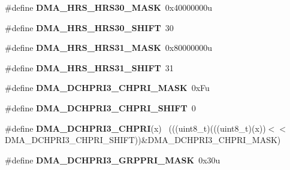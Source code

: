 \begin{DoxyCompactItemize}
\item 
\hypertarget{group___d_m_a___register___masks_ga88e7a718c482e67fd578fb6fad2b0eb4}{}\#define {\bfseries D\+M\+A\+\_\+\+H\+R\+S\+\_\+\+H\+R\+S30\+\_\+\+M\+A\+S\+K}~0x40000000u\label{group___d_m_a___register___masks_ga88e7a718c482e67fd578fb6fad2b0eb4}

\item 
\hypertarget{group___d_m_a___register___masks_ga9a353ee73d9c48a687ec33339e0a1905}{}\#define {\bfseries D\+M\+A\+\_\+\+H\+R\+S\+\_\+\+H\+R\+S30\+\_\+\+S\+H\+I\+F\+T}~30\label{group___d_m_a___register___masks_ga9a353ee73d9c48a687ec33339e0a1905}

\item 
\hypertarget{group___d_m_a___register___masks_gab1b2af9c82cbc7859e12339dd20a116c}{}\#define {\bfseries D\+M\+A\+\_\+\+H\+R\+S\+\_\+\+H\+R\+S31\+\_\+\+M\+A\+S\+K}~0x80000000u\label{group___d_m_a___register___masks_gab1b2af9c82cbc7859e12339dd20a116c}

\item 
\hypertarget{group___d_m_a___register___masks_ga720e9a6cfdc63b4a6ddf2e84f7a48e54}{}\#define {\bfseries D\+M\+A\+\_\+\+H\+R\+S\+\_\+\+H\+R\+S31\+\_\+\+S\+H\+I\+F\+T}~31\label{group___d_m_a___register___masks_ga720e9a6cfdc63b4a6ddf2e84f7a48e54}

\item 
\hypertarget{group___d_m_a___register___masks_ga4d1165f5fe24dfa63c7496f07b15e5e2}{}\#define {\bfseries D\+M\+A\+\_\+\+D\+C\+H\+P\+R\+I3\+\_\+\+C\+H\+P\+R\+I\+\_\+\+M\+A\+S\+K}~0x\+Fu\label{group___d_m_a___register___masks_ga4d1165f5fe24dfa63c7496f07b15e5e2}

\item 
\hypertarget{group___d_m_a___register___masks_gacae7dcb7b9055f80ce91ce52e36d57b6}{}\#define {\bfseries D\+M\+A\+\_\+\+D\+C\+H\+P\+R\+I3\+\_\+\+C\+H\+P\+R\+I\+\_\+\+S\+H\+I\+F\+T}~0\label{group___d_m_a___register___masks_gacae7dcb7b9055f80ce91ce52e36d57b6}

\item 
\hypertarget{group___d_m_a___register___masks_gadcbc2e3c61b70feb2217bf1a08726fe3}{}\#define {\bfseries D\+M\+A\+\_\+\+D\+C\+H\+P\+R\+I3\+\_\+\+C\+H\+P\+R\+I}(x)                                      ~(((uint8\+\_\+t)(((uint8\+\_\+t)(x))$<$$<$D\+M\+A\+\_\+\+D\+C\+H\+P\+R\+I3\+\_\+\+C\+H\+P\+R\+I\+\_\+\+S\+H\+I\+F\+T))\&D\+M\+A\+\_\+\+D\+C\+H\+P\+R\+I3\+\_\+\+C\+H\+P\+R\+I\+\_\+\+M\+A\+S\+K)\label{group___d_m_a___register___masks_gadcbc2e3c61b70feb2217bf1a08726fe3}

\item 
\hypertarget{group___d_m_a___register___masks_ga120facd8a702cdb02a92a8bc4fe465ee}{}\#define {\bfseries D\+M\+A\+\_\+\+D\+C\+H\+P\+R\+I3\+\_\+\+G\+R\+P\+P\+R\+I\+\_\+\+M\+A\+S\+K}~0x30u\label{group___d_m_a___register___masks_ga120facd8a702cdb02a92a8bc4fe465ee}


\end{DoxyCompactItemize}
